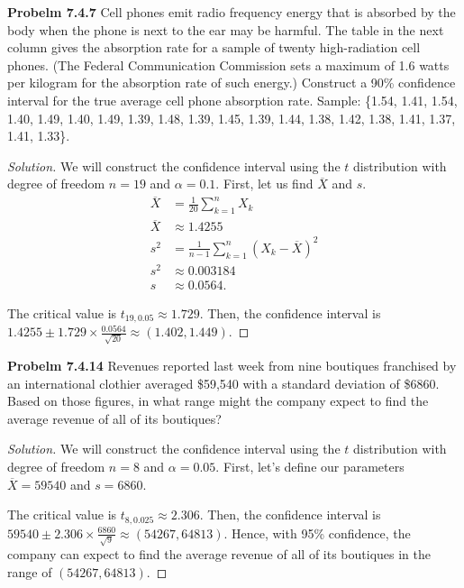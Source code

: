 \documentclass{article}
\begin{document}
\bigbreak


\textbf{Probelm 7.4.7}
Cell phones emit radio frequency energy that is absorbed by the body when the phone is next to the ear may be harmful.
The table in the next column gives the absorption rate for a sample of twenty high-radiation cell phones.
(The Federal Communication Commission sets a maximum of 1.6 watts per kilogram for the absorption rate of such energy.) 
Construct a 90\% confidence interval for the true average cell phone absorption rate.
Sample: \{1.54, 1.41, 1.54, 1.40, 1.49, 1.40, 1.49, 1.39, 1.48, 1.39, 1.45, 1.39, 1.44, 1.38, 1.42, 1.38, 1.41, 1.37, 1.41, 1.33\}.
\begin{proof}[Solution]
    We will construct the confidence interval using the $t$ distribution with degree of freedom $n=19$ and $\alpha = 0.1$.
    First, let us find $\overline{X}$ and $s$.
    \begin{align*}
        \overline{X} & = \frac{1}{20}\sum_{k=1}^{n}X_k \\
        \overline{X} & \approx 1.4255 \\
        s^2 & = \frac{1}{n-1}\sum_{k=1}^{n}(X_k-\overline{X})^2 \\
        s^2 & \approx 0.003184 \\
        s & \approx 0.0564.
    \end{align*}
    
    The critical value is $t_{19, 0.05} \approx 1.729$.
    Then, the confidence interval is $1.4255 \pm 1.729\times\frac{0.0564}{\sqrt{20}} \approx (1.402, 1.449)$.
\end{proof}
\bigbreak


\textbf{Probelm 7.4.14}
Revenues reported last week from nine boutiques franchised by an international clothier averaged \$59,540 with a standard deviation of \$6860. 
Based on those figures, in what range might the company expect to find the average revenue of all of its boutiques?
\begin{proof}[Solution]
    We will construct the confidence interval using the $t$ distribution with degree of freedom $n=8$ and $\alpha = 0.05$.
    First, let's define our parameters $\overline{X} = 59540$ and $s = 6860$.
    
    The critical value is $t_{8, 0.025} \approx 2.306$.
    Then, the confidence interval is $59540 \pm 2.306\times\frac{6860}{\sqrt{9}} \approx (54267, 64813)$.
    Hence, with 95\% confidence, the company can expect to find the average revenue of all of its boutiques in the range of $(54267, 64813)$.
\end{proof}
\bigbreak
\end{document}
